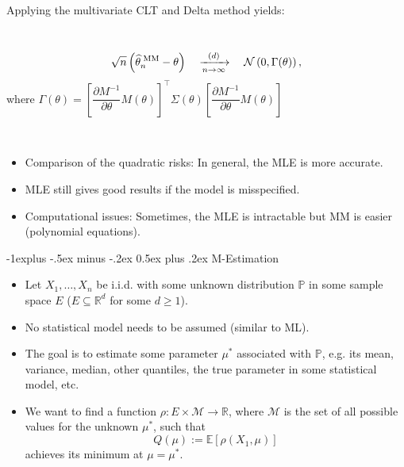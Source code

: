 \documentclass[a4paper, 10pt,landscape]{article}
\makeatletter
\renewcommand{\subsection}{\@startsection{subsection}{2}{0mm}%
                                {-1explus -.5ex minus -.2ex}%
                                {0.5ex plus .2ex}%
                                {\normalfont\normalsize\bfseries}}
\makeatother
\begin{document}
\begin{multicols*}{3}
\begin{description}
	\item Applying the multivariate CLT and Delta method yields:
	\item[Theorem] ~
	$$\sqrt{n}\left(\widehat{\theta}_n^\text{\;MM}-\theta\right)\quad\xrightarrow[n\rightarrow\infty]{(d)}\quad\mathcal{N}\left(0,\Gamma(\theta)\right),$$
	where $\Gamma(\theta)=\left[\dfrac{\partial M^{-1}}{\partial\theta}M(\theta)\right]^\intercal\Sigma(\theta)\left[\dfrac{\partial M^{-1}}{\partial\theta}M(\theta)\right]$
	\item[MLE vs. Moment Estimator] ~
	\begin{itemize}
		\item Comparison of the quadratic risks: In general, the MLE is more accurate.
		\item MLE still gives good results if the model is misspecified.
		\item Computational issues: Sometimes, the MLE is intractable but MM is easier (polynomial equations).
	\end{itemize}
\end{description}

\subsection{M-Estimation}

\begin{itemize}
	\item Let $X_1,\dots,X_n$ be i.i.d. with some unknown distribution $\mathbb{P}$ in some sample space $E$ ($E\subseteq\mathbb{R}^d$ for some $d\geq1$).
	\item No statistical model needs to be assumed (similar to ML).
	\item The goal is to estimate some parameter $\mu^*$ associated with $\mathbb{P}$, e.g. its mean, variance, median, other quantiles, the true parameter in some statistical model, etc.
	\item We want to find a function $\rho:E\times\mathcal{M}\rightarrow\mathbb{R}$, where $\mathcal{M}$ is the set of all possible values for the unknown $\mu^*$, such that
	$$Q(\mu):=\mathbb{E}\left[\rho\left(X_1,\mu\right)\right]$$
	achieves its minimum at $\mu=\mu^*$.
\end{itemize}


\end{multicols*}
\end{document}
